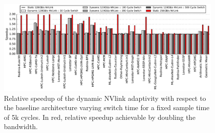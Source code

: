 








\begin{figure}[tp]
    \centering
    \includegraphics[width=1.0\textwidth]{figures/plot_nvlink_switch_time_sample_time5000.pdf}
    \caption{Relative speedup of the dynamic NVlink adaptivity with respect to
	the baseline architecture varying switch time for a fixed sample time
of 5k cycles. In red, relative speedup achievable by doubling the bandwidth.}
    \label{fig:switchtime}
\end{figure}